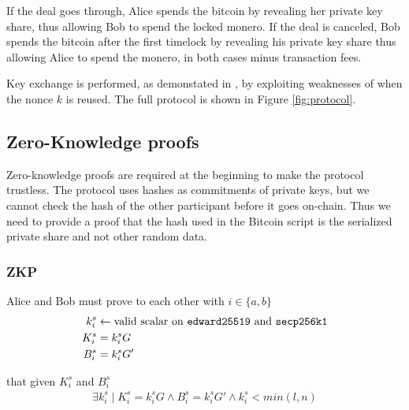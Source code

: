 \documentclass{llncs}
\begin{document}
If the deal goes through, Alice spends the bitcoin by revealing her private key share, thus allowing Bob to spend the locked monero. If the deal is canceled, Bob spends the bitcoin after the first timelock by revealing his private key share thus allowing Alice to spend the monero, in both cases minus transaction fees.

Key exchange is performed, as demonstated in \cite{cryptoeprint:2016:1184}, by exploiting weaknesses of  when the nonce $k$ is reused. The full protocol is shown in Figure \ref{fig:protocol}.

\subsection{Zero-Knowledge proofs}
Zero-knowledge proofs are required at the beginning to make the protocol trustless. The protocol uses hashes as commitments of private keys, but we cannot check the hash of the other participant before it goes on-chain. Thus we need to provide a proof that the hash used in the Bitcoin script is the serialized private share and not other random data.

\subsubsection{ZKP}
Alice and Bob must prove to each other with $i \in \{a, b\}$
\begin{equation}
\begin{split}
    k^s_i &\leftarrow \text{valid scalar on \texttt{edward25519} and \texttt{secp256k1}} \\
    K^s_i &= k^s_iG \\
    B^s_i &= k^s_iG' \\
\end{split}
\end{equation}

that given $K^s_i$ and $B^s_i$
\begin{equation}
\begin{split}
    \exists k^s_i \mid K^s_i = k^s_iG \land B^s_i = k^s_iG' \land k^s_i < min(l,n)
\end{split}
\end{equation}
\end{document}

